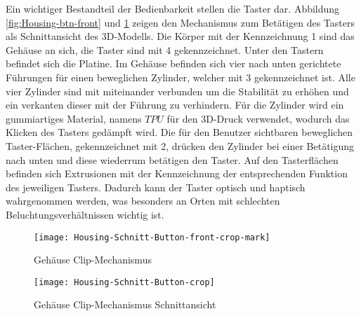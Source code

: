 Ein wichtiger Bestandteil der Bedienbarkeit stellen die Taster dar. Abbildung \ref{fig:Housing-btn-front} und \ref{fig:Housing-btn} zeigen den Mechanismus zum Betätigen des Tasters als Schnittansicht des 3D-Modells. Die Körper mit der Kennzeichnung 1 sind das Gehäuse an sich, die Taster sind mit 4 gekennzeichnet. Unter den Tastern befindet sich die Platine. Im Gehäuse befinden sich vier nach unten gerichtete Führungen für einen beweglichen Zylinder, welcher mit 3 gekennzeichnet ist. Alle vier Zylinder sind mit miteinander verbunden um die Stabilität zu erhöhen und ein verkanten dieser mit der Führung zu verhindern. Für die Zylinder wird ein gummiartiges Material, namens $TPU$ für den 3D-Druck verwendet, wodurch das Klicken des Tasters gedämpft wird. Die für den Benutzer sichtbaren beweglichen Taster-Flächen, gekennzeichnet mit 2, drücken den Zylinder bei einer Betätigung nach unten und diese wiederrum betätigen den Taster. Auf den Tasterflächen befinden sich Extrusionen mit der Kennzeichnung der entsprechenden Funktion des jeweiligen Tasters. Dadurch kann der Taster optisch und haptisch wahrgenommen werden, was besonders an Orten mit schlechten Beluchtungsverhältnissen wichtig ist.
\begin{figure}[h]
	\begin{minipage}{.45\linewidth}
		\centering
		\texttt{[image: Housing-Schnitt-Button-front-crop-mark]}
		\caption{Gehäuse Clip-Mechanismus}
		\label{fig:Housing-btn-front}
	\end{minipage}
	\hfill
	\begin{minipage}{.45\linewidth}
		\centering
		\texttt{[image: Housing-Schnitt-Button-crop]}
		\caption{Gehäuse Clip-Mechanismus Schnittansicht}
		\label{fig:Housing-btn}
	\end{minipage}
\end{figure}\\